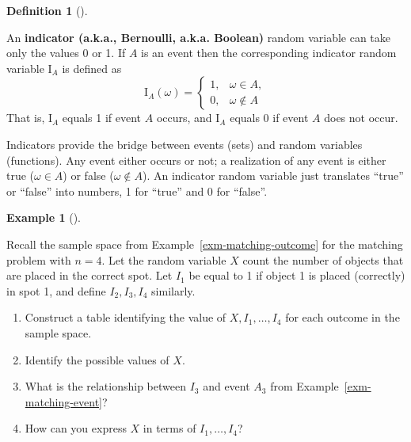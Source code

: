 \documentclass[
  letterpaper,
  DIV=11,
  numbers=noendperiod]{scrreprt}
\providecommand{\tightlist}{%
  \setlength{\itemsep}{0pt}\setlength{\parskip}{0pt}}
\theoremstyle{plain}
\theoremstyle{definition}
\newtheorem{example}{Example}[chapter]
\theoremstyle{definition}
\theoremstyle{definition}
\newtheorem{definition}{Definition}[chapter]
\theoremstyle{remark}
\begin{document}
\begin{definition}[]\protect\hypertarget{def-indicator}{}\label{def-indicator}

An \textbf{indicator (a.k.a., Bernoulli, a.k.a.
Boolean)} random variable can take only the values 0 or
1. If \(A\) is an event then the corresponding indicator random variable
\(\textrm{I}_A\) is defined as \[
\textrm{I}_A(\omega) =
\begin{cases}
1, & \omega \in A,\\
0, & \omega \notin A
\end{cases}
\] That is, \(\textrm{I}_A\) equals 1 if event \(A\) occurs, and
\(\textrm{I}_A\) equals 0 if event \(A\) does not occur.

\end{definition}

Indicators provide the bridge between events (sets) and random variables
(functions). Any event either occurs or not; a realization of any event
is either true (\(\omega \in A\)) or false (\(\omega \notin A\)). An
indicator random variable just translates ``true'' or ``false'' into
numbers, 1 for ``true'' and 0 for ``false''.

\begin{tcolorbox}[enhanced jigsaw, opacityback=0, left=2mm, colframe=quarto-callout-note-color-frame, toprule=.15mm, breakable, colback=white, leftrule=.75mm, arc=.35mm, rightrule=.15mm, bottomrule=.15mm]

\begin{example}[]\protect\hypertarget{exm-matching-indicator}{}\label{exm-matching-indicator}

Recall the sample space from Example~\ref{exm-matching-outcome} for the
matching problem with \(n=4\). Let the random variable \(X\) count the
number of objects that are placed in the correct spot. Let \(I_1\) be
equal to 1 if object 1 is placed (correctly) in spot 1, and define
\(I_2, I_3, I_4\) similarly.

\begin{enumerate}
\def\labelenumi{\arabic{enumi}.}
\tightlist
\item
  Construct a table identifying the value of \(X, I_1, \ldots, I_4\) for
  each outcome in the sample space.
\item
  Identify the possible values of \(X\).
\item
  What is the relationship between \(I_3\) and event \(A_3\) from
  Example~\ref{exm-matching-event}?
\item
  How can you express \(X\) in terms of \(I_1, \ldots, I_4\)?
\end{enumerate}

\end{example}

\end{tcolorbox}
\end{document}
